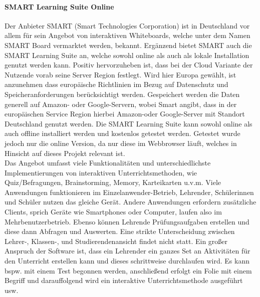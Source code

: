\paragraph{SMART Learning Suite Online}\cite{slso}
Der Anbieter SMART (Smart Technologies Corporation) ist in Deutschland vor allem für sein Angebot von interaktiven Whiteboards, welche unter dem Namen SMART Board vermarktet werden, bekannt. Ergänzend bietet SMART auch die SMART Learning Suite an, welche sowohl online als auch als lokale Installation genutzt werden kann. Positiv hervorzuheben ist, dass bei der Cloud Variante der Nutzende vorab seine Server Region festlegt. Wird hier Europa gewählt, ist anzunehmen dass europäische Richtlinien im Bezug auf Datenschutz und Speicheranforderungen berücksichtigt werden. Gespeichert werden die Daten generell auf Amazon- oder Google-Servern, wobei Smart angibt, dass in der europäischen Service Region hierbei Amazon-oder Google-Server mit Standort Deutschland genutzt werden\cite{Technologies2019}. Die SMART Learning Suite kann sowohl online als auch offline installiert werden und kostenlos getestet werden. Getestet wurde jedoch nur die online Version, da nur diese im Webbrowser läuft, welches in Hinsicht auf dieses Projekt relevant ist. \\ Das Angebot umfasst viele Funktionalitäten und unterschiedlichste Implementierungen von  interaktiven Unterrichtsmethoden, wie Quiz/Befragungen, Brainstorming, Memory, Karteikarten u.v.m. Viele Anwendungen funktionieren im Einzelanwender-Betrieb, Lehrender, Schülerinnen und Schüler nutzen das gleiche Gerät. Andere Anwendungen erfordern zusätzliche Clients, sprich Geräte wie Smartphones oder Computer, laufen also im Mehrbenutzerbetrieb. Ebenso können Lehrende Prüfungsaufgaben erstellen und diese dann Abfragen und Auswerten. Eine strikte Unterscheidung zwischen Lehrer-, Klassen-, und Studierendenansicht findet nicht statt. Ein großer Anspruch der Software ist, dass ein Lehrender ein ganzes Set an Aktivitäten für den Unterricht erstellen kann und dieses schrittweise durchlaufen wird. Es kann bspw. mit einem Test begonnen werden, anschließend erfolgt ein Folie mit einem Begriff und darauffolgend wird ein interaktive Unterrichtsmethode ausgeführt usw. 

